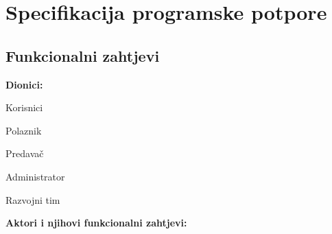 \chapter{Specifikacija programske potpore}
		
	\section{Funkcionalni zahtjevi}
			
			\noindent \textbf{Dionici:}
			
			\begin{packed_enum}
				
				\item Korisnici			
				\begin{packed_enum}
					
					\item Polaznik
					\item Predavač	
				\end{packed_enum}
				\item Administrator			
				\item Razvojni tim
				
			\end{packed_enum}
			
			\noindent \textbf{Aktori i njihovi funkcionalni zahtjevi:}
			
